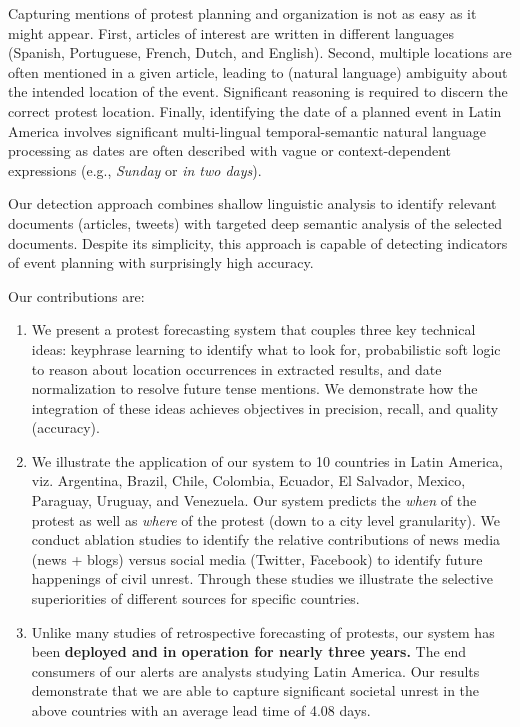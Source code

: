 Capturing mentions of protest planning and organization 
is not as easy as it might appear. First, articles of interest are written in
different languages (Spanish, Portuguese, French, Dutch, and English). 
Second, multiple locations are often mentioned in a given article, leading
to (natural language) ambiguity about the intended location of the event.
Significant reasoning is required to discern the correct protest location.
Finally, identifying the date of a planned event in Latin America involves significant multi-lingual temporal-semantic natural language processing as dates are often described with vague or context-dependent expressions (e.g., {\em Sunday} or {\em in two days}).


Our detection approach combines shallow linguistic analysis to identify relevant
documents (articles, tweets) with targeted deep semantic analysis of the selected documents. Despite its simplicity, this approach is capable of detecting indicators of event planning with surprisingly high accuracy.

Our contributions are:

\iffalse
\begin{figure}
    \texttt{[image: alertstructure]}
    \caption{An example warning (left) and GSR event (right).}
    \label{fig:alertstructure}
\end{figure}
\fi

\begin{enumerate}
\item We present a protest forecasting system that couples three key technical ideas:
keyphrase learning to identify what to look for, probabilistic soft logic to reason about location occurrences in extracted results, and 
date normalization to resolve future tense mentions. We demonstrate how the integration of these ideas achieves objectives in precision,
recall, and quality (accuracy).
\item We illustrate the application of our system to 10 countries in Latin America, viz. Argentina, Brazil, Chile, Colombia, Ecuador, El Salvador, Mexico, Paraguay, Uruguay, and Venezuela. Our system predicts the {\it when} of the protest
as well as {\it where} of the protest (down to a city level granularity).
We conduct ablation studies to identify the 
relative contributions of news media (news + blogs) versus social media (Twitter, Facebook) to identify future happenings of
civil unrest. Through these studies we illustrate the selective superiorities of different sources for specific countries.
\item Unlike many studies of retrospective forecasting of protests,
our system has been {\bf deployed and in operation for nearly three years.}
The end consumers of our alerts are analysts studying Latin America.
Our results demonstrate that we are able to 
capture significant societal unrest in the above countries with an average lead time of 4.08 days. 

\end{enumerate}

